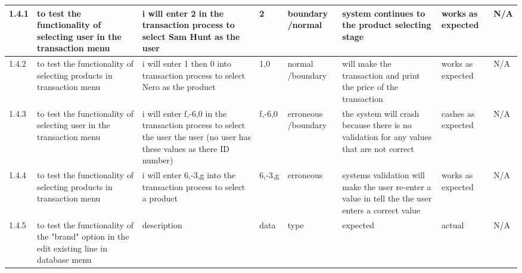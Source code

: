 \begin{landscape}
\begin{center}
\begin{longtable}{|p{1.5cm}|p{2.5cm}|p{2.5cm}|p{2cm}|p{2cm}|p{2cm}|p{2cm}|p{2cm}|}
1.4.1 & to test the functionality of selecting user in the transaction menu & i will enter 2 in the transaction process to select Sam Hunt as the user & 2 & boundary /normal & system continues to the product selecting stage & works as expected & N/A \\ \hline
1.4.2 & to test the functionality of selecting products in transaction menu & i will enter 1 then 0 into transaction process to select Nero as the product & 1,0 & normal /boundary & will make the transaction and print the price of the transaction & works as expected & N/A \\ \hline
1.4.3 & to test the functionality of selecting user in the transaction menu & i will enter f,-6,0 in the transaction process to select the user the user (no user has these values as there ID number) & f,-6,0 & erroneous /boundary & the system will crash because there is no validation for any values that are not correct & cashes as expected & N/A \\ \hline
1.4.4 & to test the functionality of selecting products in transaction menu & i will enter 6,-3,g into the transaction process to select a product & 6,-3,g & erroneous & systems validation will make the user re-enter a value in tell the the user enters a correct value & works as expected & N/A \\ \hline
1.4.5 & to test the functionality of the "brand" option in the edit existing line in database menu & description & data & type & expected & actual & N/A \\ \hline


\end{longtable}
\end{center}
\end{landscape}
